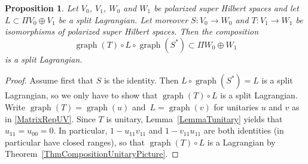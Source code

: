 \documentclass[10pt,a4paper]{amsart}
\numberwithin{equation}{section}
\newtheorem{Proposition}[Theorem]{Proposition}
 { \theoremstyle{definition}
\newtheorem{Definition}[Theorem]{Definition}
\newtheorem{Note}[Theorem]{Note}
\newtheorem{Example}[Theorem]{Example}
\newtheorem{Construction}[Theorem]{Construction}
\newtheorem{Observation}[Theorem]{Observation}
\newtheorem{Remark}[Theorem]{Remark} }
\DeclareMathOperator{\graph}{\mathrm{graph}}
\begin{document}
\begin{Proposition}
\label{PropCompositionWithGraph}
Let $V_0$, $V_1$, $W_0$ and $W_1$ be polarized super Hilbert spaces and let $L \subset \Pi V_0 \oplus V_1$ be a split Lagrangian.
Let moreover $S\colon V_0 \to W_0$ and $T\colon V_1 \to W_1$ be isomorphisms of polarized super Hilbert spaces.
Then the composition
\begin{equation*}
\graph(T) \circ L \circ \graph(S^*) \subset \Pi W_0 \oplus W_1
\end{equation*}
is a split Lagrangian.
\end{Proposition}

\begin{proof}
Assume first that $S$ is the identity.
Then $L \circ \graph(S^*) = L$ is a split Lagrangian, so we only have to show that $\graph(T) \circ L$ is a split Lagrangian.
Write $\graph(T) = \graph(u)$ and~${L = \graph(v)}$ for unitaries $u$ and $v$ as in \eqref{MatrixRepUV}.
Since $T$ is unitary, Lemma~\ref{LemmaTunitary} yields that~${u_{11} = u_{00} = 0}$.
In particular, $1-u_{11}v_{11}$ and $1-v_{11}u_{11}$ are both identities (in particular have closed ranges), so that $\graph(T) \circ L$ is a Lagrangian by Theorem~\ref{ThmCompositionUnitaryPicture}.


\end{proof}
\end{document}
